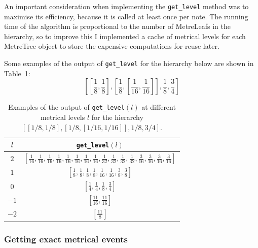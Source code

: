 \documentclass[12pt,twoside,openright]{report}
\begin{document}
An important consideration when implementing the \verb'get_level' method was to
maximise its efficiency, because it is called at least once per note. The
running time of the algorithm is proportional to the number of MetreLeafs in the
hierarchy, so to improve this I implemented a cache of metrical levels for each
MetreTree object to store the expensive computations for reuse later.

Some examples of the output of \verb'get_level' for the hierarchy below are shown in Table~\ref{table:get_level}:
\[
    \left[
        \left[\frac{1}{8},\frac{1}{8}\right],
        \left[
            \frac{1}{8},
            \left[\frac{1}{16},\frac{1}{16}\right]
        \right],
        \frac{1}{8},
        \frac{3}{4}
    \right]
\]

\begin{table}[ht]
    \centering
    \renewcommand{\arraystretch}{2.0}
    \begin{tabular}{|c|c|}
        \hline
        $l$     & \verb'get_level'$(l)$ \\
        \hline
        $2$     & $\displaystyle \left[ \frac{1}{16},\frac{1}{16},\frac{1}{16},\frac{1}{16},\frac{1}{16},\frac{1}{16},\frac{1}{16},\frac{1}{16},\frac{1}{32},\frac{1}{32},\frac{1}{32},\frac{1}{32},\frac{3}{16},\frac{3}{16},\frac{3}{16},\frac{3}{16} \right]$ \\
        $1$     & $\displaystyle \left[ \frac{1}{8},\frac{1}{8},\frac{1}{8},\frac{1}{8},\frac{1}{16},\frac{1}{16},\frac{3}{8},\frac{3}{8} \right]$ \\
        $0$     & $\displaystyle \left[ \frac{1}{4},\frac{1}{4},\frac{1}{8},\frac{3}{4} \right]$ \\
        $-1$    & $\displaystyle \left[ \frac{11}{16},\frac{11}{16} \right]$ \\
        $-2$    & $\displaystyle \left[ \frac{11}{8} \right]$ \\ [1ex]
        \hline
    \end{tabular}
    \renewcommand{\arraystretch}{1.0}
    \cprotect\caption{Examples of the output of \verb'get_level'$(l)$ at different metrical levels $l$ for the hierarchy $[[1/8,1/8],[1/8,[1/16,1/16]],1/8,3/4]$.}
    \label{table:get_level}
\end{table}

\subsubsection{Getting exact metrical events} \label{metrical_level_indices}
\end{document}
